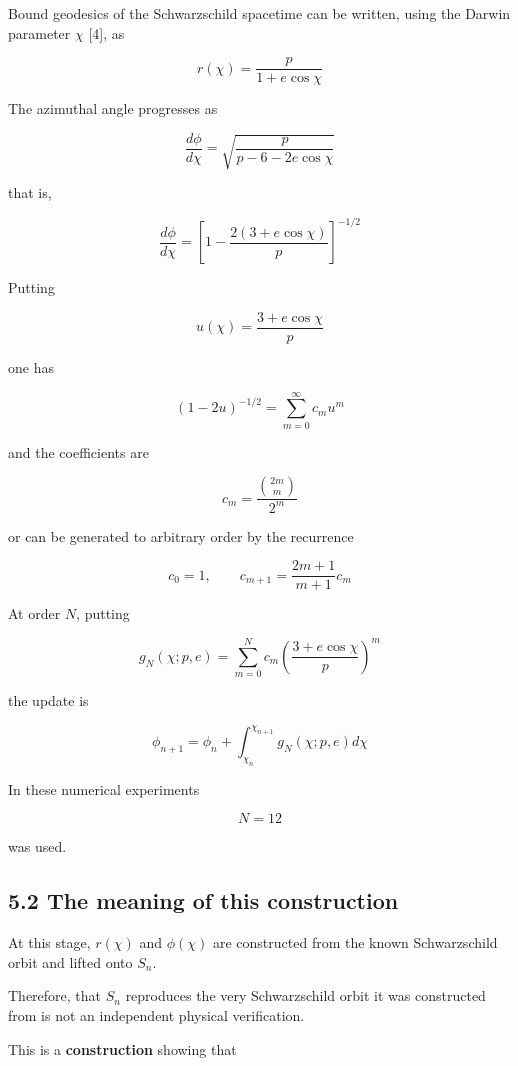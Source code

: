 \documentclass[
  a4paper,
]{article}
\begin{document}
Bound geodesics of the Schwarzschild spacetime can be written, using the
Darwin parameter \(\chi\) {[}4{]}, as

\[
r(\chi)=\frac{p}{1+e\cos\chi}
\]

The azimuthal angle progresses as

\[
\frac{d\phi}{d\chi}
=
\sqrt{\frac{p}{p-6-2e\cos\chi}}
\]

that is,

\[
\frac{d\phi}{d\chi}
=
\left[
1-\frac{2(3+e\cos\chi)}{p}
\right]^{-1/2}
\]

Putting

\[
u(\chi)=\frac{3+e\cos\chi}{p}
\]

one has

\[
(1-2u)^{-1/2}
=
\sum_{m=0}^{\infty}c_mu^m
\]

and the coefficients are

\[
c_m=\frac{\binom{2m}{m}}{2^m}
\]

or can be generated to arbitrary order by the recurrence

\[
\boxed{
c_0=1,
\qquad
c_{m+1}=\frac{2m+1}{m+1}c_m
}
\]

At order \(N\), putting

\[
g_N(\chi;p,e)
=
\sum_{m=0}^{N}
c_m
\left(
\frac{3+e\cos\chi}{p}
\right)^m
\]

the update is

\[
\phi_{n+1}
=
\phi_n+
\int_{\chi_n}^{\chi_{n+1}}
g_N(\chi;p,e)d\chi
\]

In these numerical experiments

\[
N=12
\]

was used.

\subsection{5.2 The meaning of this
construction}\label{the-meaning-of-this-construction}

At this stage, \(r(\chi)\) and \(\phi(\chi)\) are constructed from the
known Schwarzschild orbit and lifted onto \(S_n\).

Therefore, that \(S_n\) reproduces the very Schwarzschild orbit it was
constructed from is not an independent physical verification.

This is a \textbf{construction} showing that

\begin{center}
\end{center}
\end{document}
